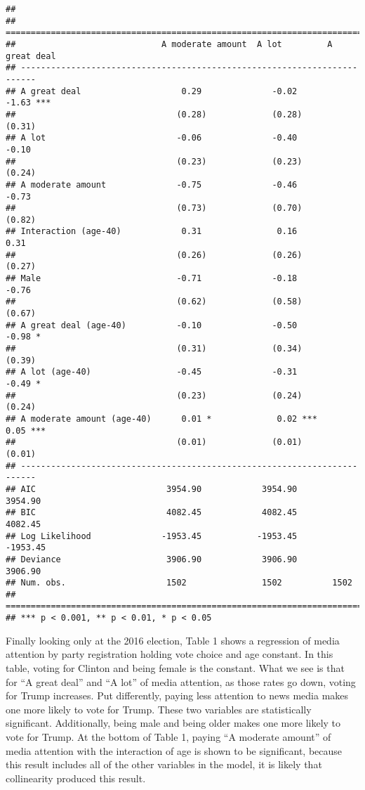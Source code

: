 \documentclass[11pt,]{article}
\begin{document}
\begin{verbatim}
## 
## =========================================================================
##                             A moderate amount  A lot         A great deal
## -------------------------------------------------------------------------
## A great deal                    0.29              -0.02         -1.63 ***
##                                (0.28)             (0.28)        (0.31)   
## A lot                          -0.06              -0.40         -0.10    
##                                (0.23)             (0.23)        (0.24)   
## A moderate amount              -0.75              -0.46         -0.73    
##                                (0.73)             (0.70)        (0.82)   
## Interaction (age-40)            0.31               0.16          0.31    
##                                (0.26)             (0.26)        (0.27)   
## Male                           -0.71              -0.18         -0.76    
##                                (0.62)             (0.58)        (0.67)   
## A great deal (age-40)          -0.10              -0.50         -0.98 *  
##                                (0.31)             (0.34)        (0.39)   
## A lot (age-40)                 -0.45              -0.31         -0.49 *  
##                                (0.23)             (0.24)        (0.24)   
## A moderate amount (age-40)      0.01 *             0.02 ***      0.05 ***
##                                (0.01)             (0.01)        (0.01)   
## -------------------------------------------------------------------------
## AIC                          3954.90            3954.90       3954.90    
## BIC                          4082.45            4082.45       4082.45    
## Log Likelihood              -1953.45           -1953.45      -1953.45    
## Deviance                     3906.90            3906.90       3906.90    
## Num. obs.                    1502               1502          1502       
## =========================================================================
## *** p < 0.001, ** p < 0.01, * p < 0.05
\end{verbatim}

Finally looking only at the 2016 election, Table 1 shows a regression of
media attention by party registration holding vote choice and age
constant. In this table, voting for Clinton and being female is the
constant. What we see is that for ``A great deal'' and ``A lot'' of
media attention, as those rates go down, voting for Trump increases. Put
differently, paying less attention to news media makes one more likely
to vote for Trump. These two variables are statistically significant.
Additionally, being male and being older makes one more likely to vote
for Trump. At the bottom of Table 1, paying ``A moderate amount'' of
media attention with the interaction of age is shown to be significant,
because this result includes all of the other variables in the model, it
is likely that collinearity produced this result.
\end{document}
